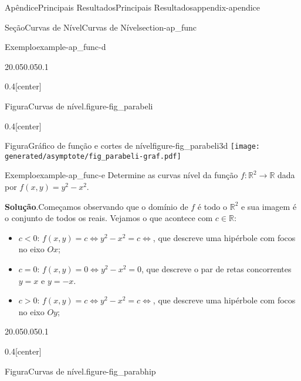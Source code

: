 \documentclass[oneside,10pt,]{book}
\newcommand{\blocktitlefont}{\relax}
\numberwithin{equation}{section}
\newcommand{\R}{\mathbb R}
\begin{document}
\begin{appendixptx}{Apêndice}{Principais Resultados}{}{Principais Resultados}{}{}{appendix-apendice}
\begin{sectionptx}{Seção}{Curvas de Nível}{}{Curvas de Nível}{}{}{section-ap_func}
\begin{example}{Exemplo}{}{example-ap_func-d}
\begin{sidebyside}{2}{0.05}{0.05}{0.1}
\begin{sbspanel}{0.4}[center]
\begin{panelfigureptx}{Figura}{Curvas de nível.}{figure-fig_parabeli}{}
{\begin{tikzpicture}
\end{tikzpicture}
}%
\tcblower
\end{panelfigureptx}%
\end{sbspanel}%
\begin{sbspanel}{0.4}[center]%
\begin{panelfigureptx}{Figura}{Gráfico de função e cortes de nível}{figure-fig_parabeli3d}{}%
\texttt{[image: generated/asymptote/fig\_parabeli-graf.pdf]}
\tcblower
\end{panelfigureptx}%
\end{sbspanel}%
\end{sidebyside}%
%
\end{example}
\begin{example}{Exemplo}{}{example-ap_func-e}%
Determine as curvas nível da função \(f\colon\R^2\to\R\) dada por \(f(x,y)=y^2-x^2\).%
\par\smallskip%
\noindent\textbf{\blocktitlefont Solução}.\hypertarget{solution-ap_func-e-b}{}\quad{}Começamos observando que o domínio de \(f\) é todo o \(\R^2\) e sua imagem é o conjunto de todos os reais. Vejamos o que acontece com \(c\in\R\):%
\begin{itemize}[label=\textbullet]
\item{}\(c<0\): \(f(x,y)=c\iff y^2-x^2=c\iff\), que descreve uma hipérbole com focos no eixo \(Ox\);%
\item{}\(c=0\): \(f(x,y)=0\iff y^2-x^2=0\), que descreve o par de retas concorrentes \(y=x\) e \(y=-x\).%
\item{}\(c>0\): \(f(x,y)=c\iff y^2-x^2=c\iff\), que descreve uma hipérbole com focos no eixo \(Oy\);%
\end{itemize}
\begin{sidebyside}{2}{0.05}{0.05}{0.1}%
\begin{sbspanel}{0.4}[center]%
\begin{panelfigureptx}{Figura}{Curvas de nível.}{figure-fig_parabhip}{}%
\end{panelfigureptx}
\end{sbspanel}
\end{sidebyside}
\end{example}
\end{sectionptx}
\end{appendixptx}
\end{document}
